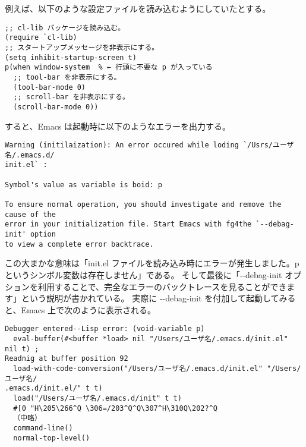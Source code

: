 例えば、以下のような設定ファイルを読み込むようにしていたとする。
\begin{mdframed}[roundcorner=0.50zw,leftmargin=3.00zw,rightmargin=3.00zw,skipabove=0.40zw,skipbelow=0.40zw,innertopmargin=4.00pt,innerbottommargin=4.00pt,innerleftmargin=5.00pt,innerrightmargin=5.00pt,linecolor=gray!020,linewidth=0.50pt,backgroundcolor=gray!20]
\begin{verbatim}
;; cl-lib パッケージを読み込む。
(require `cl-lib)
;; スタートアップメッセージを非表示にする。
(setq inhibit-startup-screen t)
p(when window-system  % ← 行頭に不要な p が入っている
  ;; tool-bar を非表示にする。
  (tool-bar-mode 0)
  ;; scroll-bar を非表示にする。
  (scroll-bar-mode 0))
\end{verbatim}
\end{mdframed}
すると、Emacs は起動時に以下のようなエラーを出力する。
\begin{mdframed}[roundcorner=0.50zw,leftmargin=3.00zw,rightmargin=3.00zw,skipabove=0.40zw,skipbelow=0.40zw,innertopmargin=4.00pt,innerbottommargin=4.00pt,innerleftmargin=5.00pt,innerrightmargin=5.00pt,linecolor=gray!090,linewidth=0.50pt,backgroundcolor=gray!90]\color{gray!10}
\begin{verbatim}
Warning (initilaization): An error occured while loding `/Usrs/ユーザ名/.emacs.d/
init.el` :

Symbol's value as variable is boid: p

To ensure normal operation, you should investigate and remove the cause of the
error in your initialization file. Start Emacs with fg4the `--debag-init' option
to view a complete error backtrace.
\end{verbatim}
\end{mdframed}
この大まかな意味は「init.el ファイルを読み込み時にエラーが発生しました。p というシンボル変数は存在しません」である。
そして最後に「-{}-debag-init オプションを利用することで、完全なエラーのバックトレースを見ることができます」という説明が書かれている。
実際に -{}-debag-init を付加して起動してみると、Emacs 上で次のように表示される。
\begin{mdframed}[roundcorner=0.50zw,leftmargin=3.00zw,rightmargin=3.00zw,skipabove=0.40zw,skipbelow=0.40zw,innertopmargin=4.00pt,innerbottommargin=4.00pt,innerleftmargin=5.00pt,innerrightmargin=5.00pt,linecolor=gray!090,linewidth=0.50pt,backgroundcolor=gray!90]\color{gray!10}
\begin{verbatim}
Debugger entered--Lisp error: (void-variable p)
  eval-buffer(#<buffer *load> nil "/Users/ユーザ名/.emacs.d/init.el" nil t) ;
Readnig at buffer position 92
  load-with-code-conversion("/Users/ユーザ名/.emacs.d/init.el" "/Users/ユーザ名/
.emacs.d/init.el/" t t)
  load("/Users/ユーザ名/.emacs.d/init" t t)
  #[0 "H\205\266^Q \306=/203^Q^Q\307^H\310Q\202?^Q
  （中略）
  command-line()
  normal-top-level()
\end{verbatim}
\end{mdframed}
